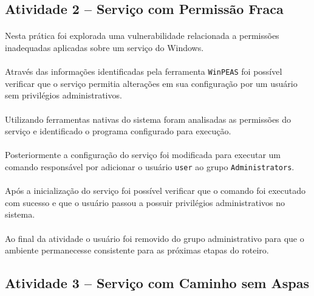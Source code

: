 \subsection{Atividade 2 -- Serviço com Permissão Fraca}

\paragraph{}
Nesta prática foi explorada uma vulnerabilidade relacionada a permissões
inadequadas aplicadas sobre um serviço do Windows.

\paragraph{}
Através das informações identificadas pela ferramenta \texttt{WinPEAS} foi
possível verificar que o serviço permitia alterações em sua configuração por um
usuário sem privilégios administrativos.

\paragraph{}
Utilizando ferramentas nativas do sistema foram analisadas as permissões do
serviço e identificado o programa configurado para execução.

\paragraph{}
Posteriormente a configuração do serviço foi modificada para executar um comando
responsável por adicionar o usuário \texttt{user} ao grupo
\texttt{Administrators}.

\paragraph{}
Após a inicialização do serviço foi possível verificar que o comando foi
executado com sucesso e que o usuário passou a possuir privilégios
administrativos no sistema.

\paragraph{}
Ao final da atividade o usuário foi removido do grupo administrativo para que o
ambiente permanecesse consistente para as próximas etapas do roteiro.

\subsection{Atividade 3 -- Serviço com Caminho sem Aspas}

